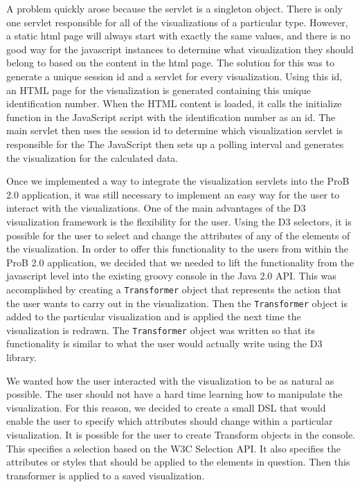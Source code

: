 A problem quickly arose because the servlet is a singleton object. There is only one servlet responsible for all of the visualizations of a particular type. However, a static html page will always start with exactly the same values, and there is no good way for the javascript instances to determine what visualization they should belong to based on the content in the html page. The solution for this was to generate a unique session id and a servlet for every visualization. Using this id, an HTML page for the visualization is generated containing this unique identification number. When the HTML content is loaded, it calls the initialize function in the JavaScript script with the identification number as an id. The main servlet then uses the session id to determine which visualization servlet is responsible for the The JavaScript then sets up a polling interval and generates the visualization for the calculated data.

Once we implemented a way to integrate the visualization servlets into the ProB 2.0 application, it was still necessary to implement an easy way for the user to interact with the visualizations. One of the main advantages of the D3 visualization framework is the flexibility for the user. Using the D3 selectors, it is possible for the user to select and change the attributes of any of the elements of the visualization. In order to offer this functionality to the users from within the ProB 2.0 application, we decided that we needed to lift the functionality from the javascript level into the existing groovy console in the Java 2.0 API. This was accomplished by creating a \texttt{Transformer} object that represents the action that the user wants to carry out in the visualization. Then the \texttt{Transformer} object is added to the particular visualization and is applied the next time the visualization is redrawn. The \texttt{Transformer} object was written so that its functionality is similar to what the user would actually write using the D3 library.

We wanted how the user interacted with the visualization to be as natural as possible. The user should not have a hard time learning how to manipulate the visualization. For this reason, we decided to create a small DSL that would enable the user to specify which attributes should change within a particular visualization. It is possible for the user to create Transform objects in the console. This specifies a selection based on the W3C Selection API. It also specifies the attributes or styles that should be applied to the elements in question. Then this transformer is applied to a saved visualization.

